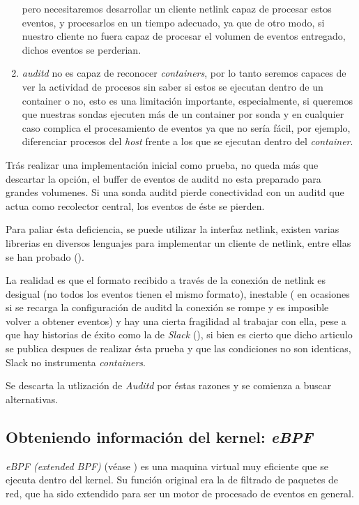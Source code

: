 \begin{enumerate}
    pero necesitaremos desarrollar un cliente netlink capaz de procesar estos eventos, 
    y procesarlos en un tiempo adecuado, ya que de otro modo, 
    si nuestro cliente no fuera capaz de procesar el volumen de eventos entregado,
    dichos eventos se perderian.
    \item \emph{auditd} no es capaz de reconocer \emph{containers}, por lo tanto seremos capaces de ver la actividad de procesos
    sin saber si estos se ejecutan dentro de un container o no, esto es una limitación importante, especialmente, si queremos que nuestras sondas
    ejecuten más de un container por sonda y en cualquier caso complica el procesamiento de eventos ya que no sería fácil, por ejemplo, diferenciar procesos
    del \emph{host} frente a los que se ejecutan dentro del \emph{container}.
\end{enumerate}

Trás realizar una implementación inicial como prueba, no queda más que descartar la opción, el buffer de eventos de auditd no esta preparado para grandes volumenes.
Si una sonda auditd pierde conectividad con un auditd que actua como recolector central, los eventos de éste se pierden.

Para paliar ésta deficiencia, se puede utilizar la interfaz netlink, existen varias librerias en diversos lenguajes para implementar un cliente de netlink, entre ellas
se han probado (\cite{netlink-glnpy,netlink-audit-go,netlink-go-audit}).

La realidad es que el formato recibido a través de la conexión de netlink es desigual (no todos los eventos tienen el mismo formato), inestable ( en ocasiones si se recarga la configuración de auditd la conexión se rompe y es imposible volver a obtener eventos) y hay una cierta fragilidad al trabajar con ella, pese a que hay historias de éxito
como la de \emph{Slack} (\cite{netlink-slack-success}), si bien es cierto que dicho articulo se publica despues de realizar ésta prueba y que las condiciones no son identicas, Slack no instrumenta \emph{containers}.

Se descarta la utlización de \emph{Auditd} por éstas razones y se comienza a buscar alternativas.

\subsection{Obteniendo información del kernel: \emph{eBPF}}

\emph{eBPF (extended BPF)} (véase \cite{ebpf-brendan-gregg,ebpf-series}) es una maquina virtual muy eficiente que se ejecuta dentro del kernel. Su función original era la de filtrado de paquetes de red, que ha sido
extendido para ser un motor de procesado de eventos en general.

